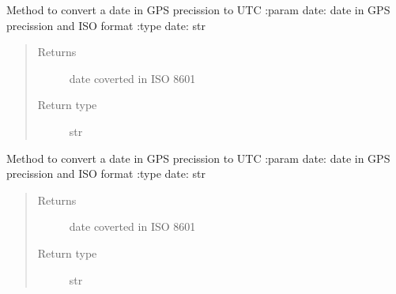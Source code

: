 
\begin{fulllineitems}
\label{\detokenize{s2boa.ingestions:s2boa.ingestions.functions.convert_from_datetime_gps_to_datetime_utc}}
Method to convert a date in GPS precission to UTC
:param date: date in GPS precission and ISO format
:type date: str
\begin{quote}\begin{description}
\item[{Returns}] \leavevmode
date coverted in ISO 8601

\item[{Return type}] \leavevmode
str

\end{description}\end{quote}

\end{fulllineitems}


\begin{fulllineitems}
\label{\detokenize{s2boa.ingestions:s2boa.ingestions.functions.convert_from_gps_to_utc}}
Method to convert a date in GPS precission to UTC
:param date: date in GPS precission and ISO format
:type date: str
\begin{quote}\begin{description}
\item[{Returns}] \leavevmode
date coverted in ISO 8601

\item[{Return type}] \leavevmode
str

\end{description}\end{quote}

\end{fulllineitems}

